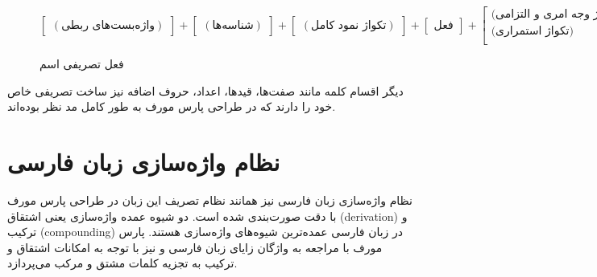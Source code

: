 \documentclass[12pt,onecolumn,a4paper]{article}
\begin{document}
    \begin{figure}[hp]
        \[
            \begin{bmatrix}
                (\textrm{واژه‌بست‌های ربطی})
            \end{bmatrix}
            +
            \begin{bmatrix}
                (\textrm{شناسه‌ها})
            \end{bmatrix}
            +
            \begin{bmatrix}
                (\textrm{تکواژ نمود کامل})
            \end{bmatrix}
            +
            \begin{bmatrix}
                \textrm{فعل}
            \end{bmatrix}
            +
            \begin{bmatrix}
                \textrm{(تکواژ وجه امری و التزامی)} \\
                \textrm{(تکواژ استمراری)} \\
            \end{bmatrix}
            +
            \begin{bmatrix}
                \textrm{تکواژ نفی}
            \end{bmatrix}
        \]
        \caption{فعل تصریفی اسم {\mfo\citep{Eslami88}}}
    \end{figure}

    \par\noindent
    دیگر اقسام کلمه مانند صفت‌ها، قیدها، اعداد، حروف اضافه نیز ساخت تصریفی خاص خود را دارند که در طراحی پارس مورف به طور کامل مد نظر بوده‌اند.

    \section{نظام واژه‌سازی زبان فارسی}
    نظام واژه‌سازی زبان فارسی نیز همانند نظام تصریف این زبان در طراحی پارس مورف با دقت صورت‌بندی شده است. دو شیوه عمده واژه‌سازی یعنی اشتقاق (derivation) و ترکیب (compounding) در زبان فارسی عمده‌ترین شیوه‌های واژه‌سازی هستند. پارس مورف با مراجعه به واژگان زایای زبان فارسی {\mfo\citep{Eslami83}} و نیز با توجه به امکانات اشتقاق و ترکیب به تجزیه کلمات مشتق و مرکب می‌پردازد.
\end{document}
